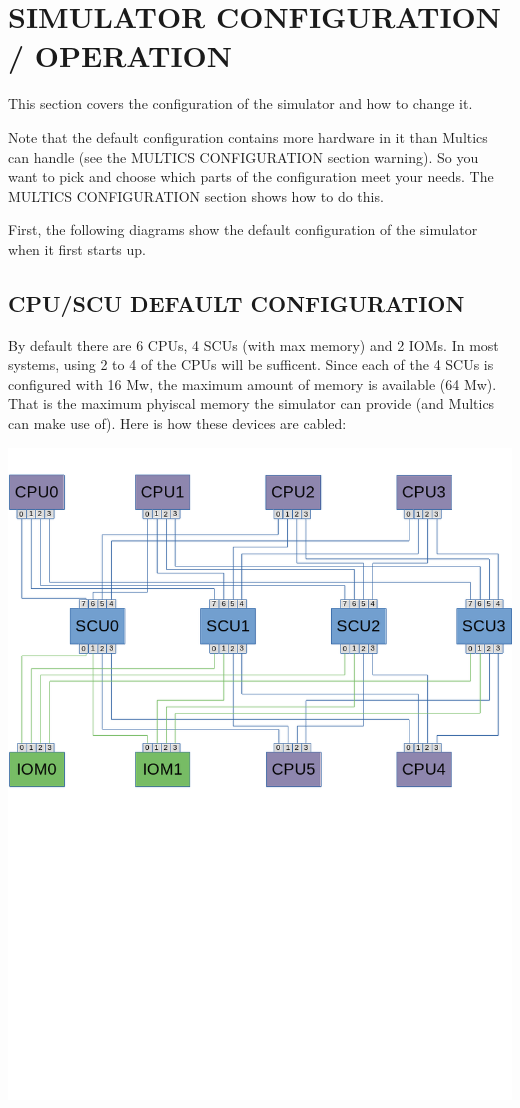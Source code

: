 \section[Simulator Configuration / Operation]{SIMULATOR CONFIGURATION / OPERATION}

This section covers the configuration of the simulator and how to change it.

Note that the default configuration contains more hardware in it than Multics can handle (see the MULTICS CONFIGURATION section warning).
So you want to pick and choose which parts of the configuration meet your needs. The MULTICS CONFIGURATION section shows how to do this.

First, the following diagrams show the default configuration of the simulator
when it first starts up.

\subsection[CPU/SCU Default Configuration]{CPU/SCU DEFAULT CONFIGURATION}

By default there are 6 CPUs, 4 SCUs (with max memory) and 2 IOMs. In most systems, using 2 to 4 of the CPUs will be sufficent. Since each of the 
4 SCUs is configured with 16 Mw, the maximum amount of memory is available (64 Mw). That is the maximum phyiscal memory the simulator can provide (and 
Multics can make use of). Here is how these devices are cabled:

\noindent\includegraphics[width=\textwidth,height=\textheight,keepaspectratio]{DefaultCablingDiagram-cpu.png}


